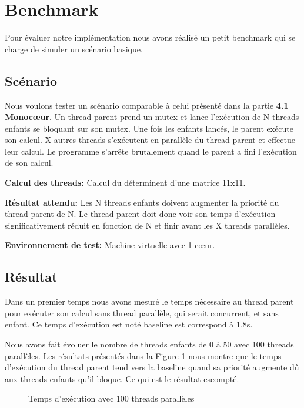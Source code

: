 \section{Benchmark}

Pour évaluer notre implémentation nous avons réalisé un petit benchmark qui se charge de simuler un
scénario basique.

\subsection{Scénario}

Nous voulons tester un scénario comparable à celui présenté dans la partie \textbf{4.1 Monocœur}.
Un thread parent prend un mutex et lance l'exécution de N threads enfants se bloquant sur son mutex.
Une fois les enfants lancés, le parent exécute son calcul.
X autres threads s'exécutent en parallèle du thread parent et effectue leur calcul.
Le programme s'arrête brutalement quand le parent a fini l'exécution de son calcul.

\noindent \textbf{Calcul des threads:} 
Calcul du déterminent d'une matrice 11x11.

\noindent \textbf{Résultat attendu:}
Les N threads enfants doivent augmenter la priorité du thread parent de N. Le thread parent doit donc voir son temps d'exécution significativement réduit en fonction de N et finir avant les X threads parallèles.

\noindent \textbf{Environnement de test:}
Machine virtuelle avec 1 cœur.

\subsection{Résultat}

Dans un premier temps nous avons mesuré le temps nécessaire au thread parent pour exécuter son calcul
sans thread parallèle, qui serait concurrent, et sans enfant.
Ce temps d'exécution est noté baseline est correspond à 1,8s.

Nous avons fait évoluer le nombre de threads enfants de 0 à 50 avec 100 threads parallèles. 
Les résultats présentés dans la Figure \ref{fig:result} nous montre que le temps d'exécution
du thread parent tend vers la baseline quand sa priorité augmente dû aux threads enfants qu'il bloque.
Ce qui est le résultat escompté. 

\begin{figure}[h!]
	\centering
	\caption{Temps d'exécution avec 100 threads parallèles}
	\label{fig:result}
\end{figure}

